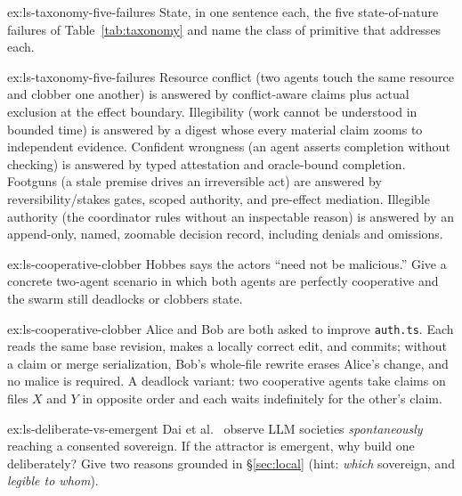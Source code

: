 \documentclass[11pt,a4paper]{article}
\theoremstyle{definition}
\theoremstyle{plain}
\begin{document}

\begin{pdexercise}[kind=Check,rating=1]{ex:ls-taxonomy-five-failures}
State, in one sentence each, the five state-of-nature failures of
Table~\ref{tab:taxonomy} and name the class of primitive that addresses each.
\end{pdexercise}
\begin{pdsolution}{ex:ls-taxonomy-five-failures}
Resource conflict (two agents touch the same resource and clobber one another) is answered by conflict-aware claims plus actual exclusion at the effect boundary. Illegibility (work cannot be understood in bounded time) is answered by a digest whose every material claim zooms to independent evidence. Confident wrongness (an agent asserts completion without checking) is answered by typed attestation and oracle-bound completion. Footguns (a stale premise drives an irreversible act) are answered by reversibility/stakes gates, scoped authority, and pre-effect mediation. Illegible authority (the coordinator rules without an inspectable reason) is answered by an append-only, named, zoomable decision record, including denials and omissions.
\end{pdsolution}
\begin{pdexercise}[kind=Check,rating=1]{ex:ls-cooperative-clobber}
Hobbes says the actors ``need not be malicious.'' Give a concrete two-agent
scenario in which both agents are perfectly cooperative and the swarm still
deadlocks or clobbers state.
\end{pdexercise}
\begin{pdsolution}{ex:ls-cooperative-clobber}
Alice and Bob are both asked to improve \texttt{auth.ts}. Each reads the same base revision, makes a locally correct edit, and commits; without a claim or merge serialization, Bob's whole-file rewrite erases Alice's change, and no malice is required. A deadlock variant: two cooperative agents take claims on files $X$ and $Y$ in opposite order and each waits indefinitely for the other's claim.
\end{pdsolution}
\begin{pdexercise}[kind=Trace,rating=2]{ex:ls-deliberate-vs-emergent}
Dai et al.~ observe LLM societies \emph{spontaneously} reaching
a consented sovereign. If the attractor is emergent, why build one deliberately? Give
two reasons grounded in \S\ref{sec:local} (hint: \emph{which} sovereign, and
\emph{legible to whom}).
\end{pdexercise}
\end{document}
